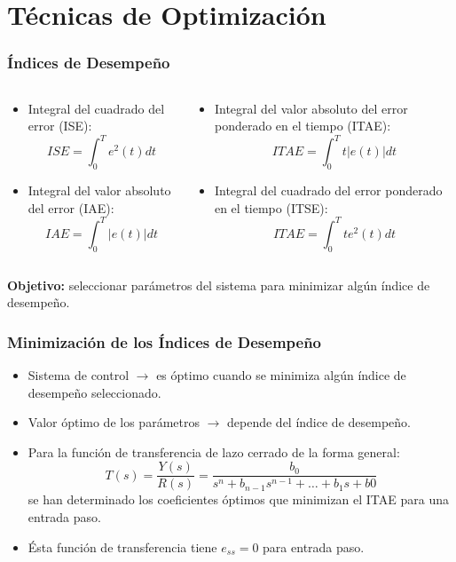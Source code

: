 \documentclass[aspectratio=169,handout]{beamer}
\theoremstyle{definition}
\theoremstyle{plain}
\theoremstyle{remark}
\begin{document}
\section{Técnicas de Optimización}
\begin{frame}[<+->]\frametitle{Índices de Desempeño}
	\begin{columns}
	\begin{column}{0.5\textwidth}
	\begin{itemize}
		\item Integral del cuadrado del error (ISE):
		\begin{equation*}
			ISE = \int_0^T e^2(t) dt
		\end{equation*}
		\item Integral del valor absoluto del error (IAE):
		\begin{equation*}
			IAE = \int_0^T |e(t)| dt
		\end{equation*}
	\end{itemize}
	\end{column}	
	\begin{column}{0.5\textwidth}
	\begin{itemize}
		\item Integral del valor absoluto del error ponderado en el tiempo (ITAE):
		\begin{equation*}
			ITAE = \int_0^T t |e(t)| dt
		\end{equation*}
		\item Integral del cuadrado del error ponderado en el tiempo (ITSE):
		\begin{equation*}
			ITAE = \int_0^T t e^2(t) dt
		\end{equation*}
	\end{itemize}
	\end{column}	
	\end{columns}
	\vspace*{-5mm}
	\textbf{Objetivo:} seleccionar parámetros del sistema para minimizar algún índice de desempeño.
\end{frame}
\begin{frame}[<+->]\frametitle{Minimización de los Índices de Desempeño}
\begin{itemize}
	\item Sistema de control $\rightarrow$ es óptimo cuando se minimiza algún índice de desempeño seleccionado.
	\item Valor óptimo de los parámetros $\rightarrow$ depende del índice de desempeño.
	\item Para la función de transferencia de lazo cerrado de la forma general:
	\begin{equation*}
		T(s) = \frac{Y(s)}{R(s)} = \frac{b_0}{s^n + b_{n-1} s^{n-1} + \dots + b_1 s + b0}
	\end{equation*}
	se han determinado los coeficientes óptimos que minimizan el ITAE para una entrada paso.
	\item Ésta función de transferencia tiene $e_{ss} = 0$ para entrada paso.
\end{itemize}
\end{frame}
\end{document}
